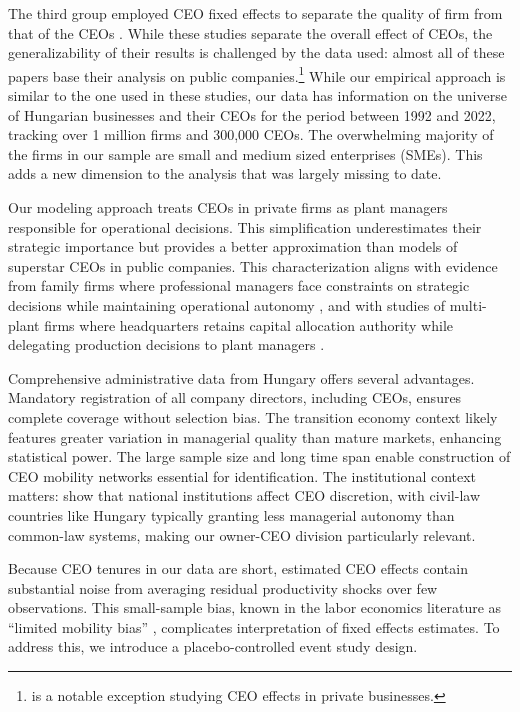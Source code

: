\documentclass[11pt,a4paper]{article}
\begin{document}
The third group employed CEO fixed effects to separate the quality of firm from that of the CEOs \citep{Bertrand2003-io,crossland2011differences,quigley2015has}. While these studies separate the overall effect of CEOs, the generalizability of their results is challenged by the data used: almost all of these papers base their analysis on public companies.\footnote{\citep{quigley2022ceo} is a notable exception studying CEO effects in private businesses.} While our empirical approach is similar to the one used in these studies, our data has information on the universe of Hungarian businesses and their CEOs for the period between 1992 and 2022, tracking over 1 million firms and 300,000 CEOs. The overwhelming majority of the firms in our sample are small and medium sized enterprises (SMEs). This adds a new dimension to the analysis that was largely missing to date.

Our modeling approach treats CEOs in private firms as plant managers responsible for operational decisions. This simplification underestimates their strategic importance but provides a better approximation than models of superstar CEOs in public companies. This characterization aligns with evidence from family firms where professional managers face constraints on strategic decisions while maintaining operational autonomy \citep{zellweger2012managing}, and with studies of multi-plant firms where headquarters retains capital allocation authority while delegating production decisions to plant managers \citep{bloom2012americans}.

Comprehensive administrative data from Hungary offers several advantages. Mandatory registration of all company directors, including CEOs, ensures complete coverage without selection bias. The transition economy context likely features greater variation in managerial quality than mature markets, enhancing statistical power. The large sample size and long time span enable construction of CEO mobility networks essential for identification. The institutional context matters: \citet{crossland2011differences} show that national institutions affect CEO discretion, with civil-law countries like Hungary typically granting less managerial autonomy than common-law systems, making our owner-CEO division particularly relevant.

Because CEO tenures in our data are short, estimated CEO effects contain substantial noise from averaging residual productivity shocks over few observations. This small-sample bias, known in the labor economics literature as ``limited mobility bias'' \citep{andrews2008high}, complicates interpretation of fixed effects estimates. To address this, we introduce a placebo-controlled event study design.
\end{document}

